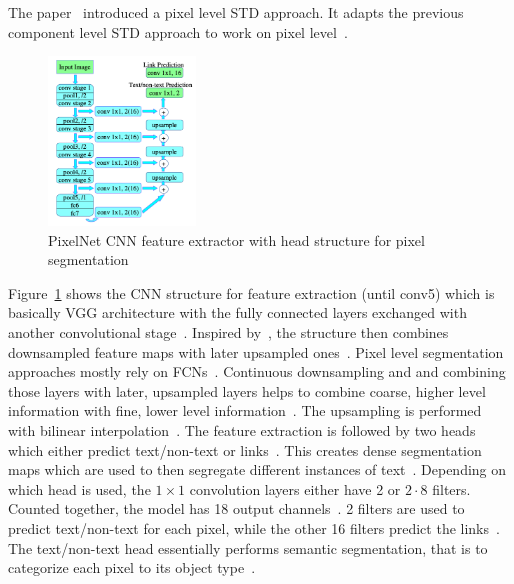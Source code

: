 The paper~\cite{deng_pixellink_2018} introduced a pixel level \ac{STD} approach.
It adapts the previous component level \ac{STD} approach to work on pixel
level~\citep{deng_pixellink_2018}.
\begin{figure}[ht]
    \centering
    \includegraphics[width=0.35\textwidth]{img/STD-seg-based-CNN-Deng-PixelLink-2018.png}
    \caption[Feature extractor and prediction head for pixel segmentation]{%
        PixelNet CNN feature extractor with head structure for pixel
        segmentation\label{fig:STD-segbased-pixel-CNN}
    }
\end{figure}
Figure~\ref{fig:STD-segbased-pixel-CNN} shows the \ac{CNN} structure for feature extraction
(until conv5) which is basically VGG architecture with the fully connected layers exchanged with
another convolutional stage~\citep{deng_pixellink_2018}.
Inspired by~\cite{long_fully_2015}, the structure then combines downsampled feature maps with later
upsampled ones~\citep{deng_pixellink_2018}.
Pixel level segmentation approaches mostly rely on \acp{FCN}~\citep{dai_fused_2018}.
Continuous downsampling and and combining those layers with later, upsampled layers helps
to combine coarse, higher level information with fine, lower level
information~\citep{long_fully_2015}.
The upsampling is performed with bilinear interpolation~\citep{deng_pixellink_2018}.
The feature extraction is followed by two heads which either predict text/non-text or
links~\citep{deng_pixellink_2018}.
This creates dense segmentation maps which are used to then segregate different
instances of text~\citep{deng_pixellink_2018}.
Depending on which head is used, the $1\times1$ convolution layers either have 2 or $2\cdot8$ filters.
Counted together, the model has 18 output channels~\citep{deng_pixellink_2018}.
2 filters are used to predict text/non-text for each pixel, while the other 16 filters predict
the links~\citep{deng_pixellink_2018}.
The text/non-text head essentially performs semantic segmentation, that is to categorize each
pixel to its object type~\citep{deng_pixellink_2018}.
